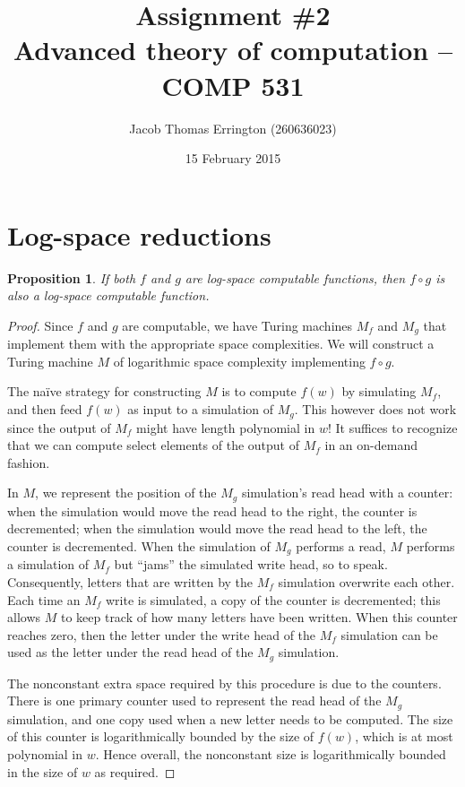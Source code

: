 \documentclass[11pt,letterpaper]{article}
\author{Jacob Thomas Errington (260636023)}
\title{Assignment \#2\\Advanced theory of computation -- COMP 531}
\date{15 February 2015}
\newtheorem{proposition}{Proposition}
\begin{document}
\maketitle

\section{Log-space reductions}

\begin{proposition}
    If both $f$ and $g$ are log-space computable functions, then $f \circ g$ is
    also a log-space computable function.
\end{proposition}

\begin{proof}
    Since $f$ and $g$ are computable, we have Turing machines $M_f$ and $M_g$
    that implement them with the appropriate space complexities. We will
    construct a Turing machine $M$ of logarithmic space complexity implementing
    $f \circ g$.

    The na\"ive strategy for constructing $M$ is to compute $f(w)$ by
    simulating $M_f$, and then feed $f(w)$ as input to a simulation of $M_g$.
    This however does not work since the output of $M_f$ might have length
    polynomial in $w$! It suffices to recognize that we can compute select
    elements of the output of $M_f$ in an on-demand fashion.

    In $M$, we represent the position of the $M_g$ simulation's read head with
    a counter: when the simulation would move the read head to the right, the
    counter is decremented; when the simulation would move the read head to the
    left, the counter is decremented. When the simulation of $M_g$ performs a
    read, $M$ performs a simulation of $M_f$ but ``jams'' the simulated write
    head, so to speak. Consequently, letters that are written by the $M_f$
    simulation overwrite each other. Each time an $M_f$ write is simulated, a
    copy of the counter is decremented; this allows $M$ to keep track of how
    many letters have been written. When this counter reaches zero, then the
    letter under the write head of the $M_f$ simulation can be used as the
    letter under the read head of the $M_g$ simulation.

    The nonconstant extra space required by this procedure is due to the
    counters. There is one primary counter used to represent the read head of
    the $M_g$ simulation, and one copy used when a new letter needs to be
    computed. The size of this counter is logarithmically bounded by the size
    of $f(w)$, which is at most polynomial in $w$. Hence overall, the
    nonconstant size is logarithmically bounded in the size of $w$ as required.
\end{proof}
\end{document}
